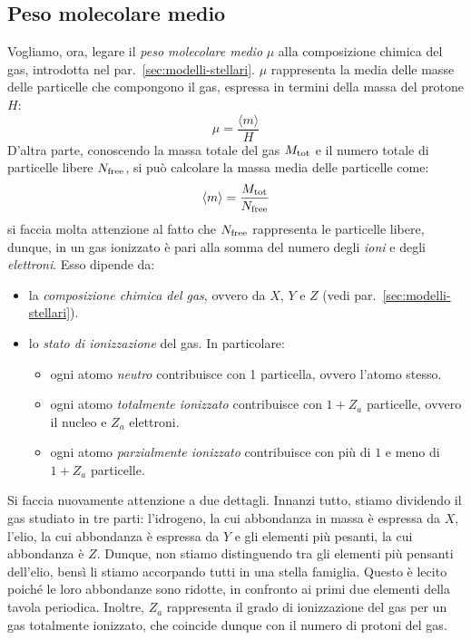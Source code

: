 \subsection{Peso molecolare medio}\label{sec:peso-molecolare}
Vogliamo, ora, legare il \emph{peso molecolare medio} $\mu$ alla composizione chimica del gas, introdotta nel par.~\ref{sec:modelli-stellari}. $\mu$ rappresenta la media delle masse delle particelle che compongono il gas, espressa in termini della massa del protone $H$:
\begin{equation}\label{eq:peso-molecolare-medio-definizione}
    \mu = \frac{\langle m \rangle}{H}
\end{equation}
D'altra parte, conoscendo la massa totale del gas $M_\textup{tot}$ e il numero totale di particelle libere $N_\textup{free}$, si può calcolare la massa media delle particelle come:
\begin{equation}\label{eq:massa-media-particelle}
    \langle m \rangle = \frac{M_\textup{tot}}{N_\textup{free}}
\end{equation}
si faccia molta attenzione al fatto che $N_\textup{free}$ rappresenta le particelle libere, dunque, in un gas ionizzato è pari alla somma del numero degli \emph{ioni} e degli \emph{elettroni}. Esso dipende da:
\begin{itemize}
    \item la \emph{composizione chimica del gas}, ovvero da $X$, $Y$ e $Z$ (vedi par.~\ref{sec:modelli-stellari}).
    \item lo \emph{stato di ionizzazione} del gas. In particolare:
    \begin{itemize}
        \item ogni atomo \emph{neutro} contribuisce con 1 particella, ovvero l'atomo stesso.
        \item ogni atomo \emph{totalmente ionizzato} contribuisce con $1+Z_a$ particelle, ovvero il nucleo e $Z_a$ elettroni.
        \item ogni atomo \emph{parzialmente ionizzato} contribuisce con più di $1$ e meno di $1+Z_a$ particelle.
    \end{itemize}
\end{itemize}
Si faccia nuovamente attenzione a due dettagli. Innanzi tutto, stiamo dividendo il gas studiato in tre parti: l'idrogeno, la cui abbondanza in massa è espressa da $X$, l'elio, la cui abbondanza è espressa da $Y$ e gli elementi più pesanti, la cui abbondanza è $Z$. Dunque, non stiamo distinguendo tra gli elementi più pensanti dell'elio, bensì li stiamo accorpando tutti in una stella famiglia. Questo è lecito poiché le loro abbondanze sono ridotte, in confronto ai primi due elementi della tavola periodica. Inoltre, $Z_a$ rappresenta il grado di ionizzazione del gas per un gas totalmente ionizzato, che coincide dunque con il numero di protoni del gas.

